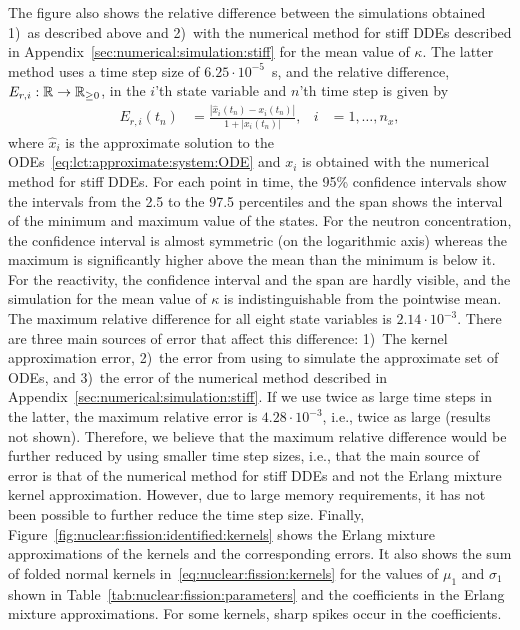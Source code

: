 %
The figure also shows the relative difference between the simulations obtained 1)~as described above and 2)~with the numerical method for stiff DDEs described in Appendix~\ref{sec:numerical:simulation:stiff} for the mean value of $\kappa$. The latter method uses a time step size of $6.25\cdot 10^{-5}$~s, and the relative difference, $E_{r, i}: \mathbb{R} \rightarrow \mathbb{R}_{\geq 0}$, in the $i$'th state variable and $n$'th time step is given by
%
\begin{align}\label{eq:relative:error}
	E_{r, i}(t_n) &= \frac{|\hat x_i(t_n) - x_i(t_n)|}{1 + |x_i(t_n)|}, & i &= 1, \ldots, n_x,
\end{align}
%
where $\hat x_i$ is the approximate solution to the ODEs~\eqref{eq:lct:approximate:system:ODE} and $x_i$ is obtained with the numerical method for stiff DDEs.
%
For each point in time, the 95\% confidence intervals show the intervals from the 2.5 to the 97.5 percentiles and the span shows the interval of the minimum and maximum value of the states. For the neutron concentration, the confidence interval is almost symmetric (on the logarithmic axis) whereas the maximum is significantly higher above the mean than the minimum is below it. For the reactivity, the confidence interval and the span are hardly visible, and the simulation for the mean value of $\kappa$ is indistinguishable from the pointwise mean.
%
The maximum relative difference for all eight state variables is $2.14\cdot 10^{-3}$. There are three main sources of error that affect this difference: 1)~The kernel approximation error, 2)~the error from using \odeofs{} to simulate the approximate set of ODEs, and 3)~the error of the numerical method described in Appendix~\ref{sec:numerical:simulation:stiff}. If we use twice as large time steps in the latter, the maximum relative error is $4.28\cdot 10^{-3}$, i.e., twice as large (results not shown). Therefore, we believe that the maximum relative difference would be further reduced by using smaller time step sizes, i.e., that the main source of error is that of the numerical method for stiff DDEs and not the Erlang mixture kernel approximation. However, due to large memory requirements, it has not been possible to further reduce the time step size.
%
Finally, Figure~\ref{fig:nuclear:fission:identified:kernels} shows the Erlang mixture approximations of the kernels and the corresponding errors. It also shows the sum of folded normal kernels in~\eqref{eq:nuclear:fission:kernels} for the values of $\mu_1$ and $\sigma_1$ shown in Table~\ref{tab:nuclear:fission:parameters} and the coefficients in the Erlang mixture approximations. For some kernels, sharp spikes occur in the coefficients.

